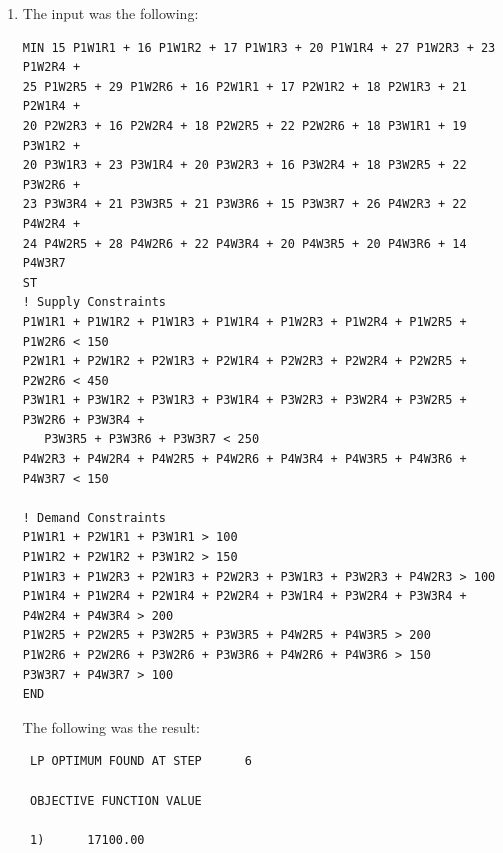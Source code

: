 \documentclass[11pt,letterpaper]{article}
\begin{document}
\begin{enumerate}
	\item The input was the following:
	\begin{verbatim}
MIN	15 P1W1R1 + 16 P1W1R2 + 17 P1W1R3 + 20 P1W1R4 + 27 P1W2R3 + 23 P1W2R4 + 
25 P1W2R5 + 29 P1W2R6 + 16 P2W1R1 + 17 P2W1R2 + 18 P2W1R3 + 21 P2W1R4 + 
20 P2W2R3 + 16 P2W2R4 + 18 P2W2R5 + 22 P2W2R6 + 18 P3W1R1 + 19 P3W1R2 + 
20 P3W1R3 + 23 P3W1R4 + 20 P3W2R3 + 16 P3W2R4 + 18 P3W2R5 + 22 P3W2R6 + 
23 P3W3R4 + 21 P3W3R5 + 21 P3W3R6 + 15 P3W3R7 + 26 P4W2R3 + 22 P4W2R4 + 
24 P4W2R5 + 28 P4W2R6 + 22 P4W3R4 + 20 P4W3R5 + 20 P4W3R6 + 14 P4W3R7
ST
! Supply Constraints
P1W1R1 + P1W1R2 + P1W1R3 + P1W1R4 + P1W2R3 + P1W2R4 + P1W2R5 + P1W2R6 < 150
P2W1R1 + P2W1R2 + P2W1R3 + P2W1R4 + P2W2R3 + P2W2R4 + P2W2R5 + P2W2R6 < 450
P3W1R1 + P3W1R2 + P3W1R3 + P3W1R4 + P3W2R3 + P3W2R4 + P3W2R5 + P3W2R6 + P3W3R4 +
   P3W3R5 + P3W3R6 + P3W3R7 < 250
P4W2R3 + P4W2R4 + P4W2R5 + P4W2R6 + P4W3R4 + P4W3R5 + P4W3R6 + P4W3R7 < 150

! Demand Constraints
P1W1R1 + P2W1R1 + P3W1R1 > 100
P1W1R2 + P2W1R2 + P3W1R2 > 150
P1W1R3 + P1W2R3 + P2W1R3 + P2W2R3 + P3W1R3 + P3W2R3 + P4W2R3 > 100
P1W1R4 + P1W2R4 + P2W1R4 + P2W2R4 + P3W1R4 + P3W2R4 + P3W3R4 + P4W2R4 + P4W3R4 > 200
P1W2R5 + P2W2R5 + P3W2R5 + P3W3R5 + P4W2R5 + P4W3R5 > 200
P1W2R6 + P2W2R6 + P3W2R6 + P3W3R6 + P4W2R6 + P4W3R6 > 150
P3W3R7 + P4W3R7 > 100
END
	\end{verbatim}
	
	The following was the result:
	\begin{verbatim}
 LP OPTIMUM FOUND AT STEP      6
 
 OBJECTIVE FUNCTION VALUE
 
 1)      17100.00
 

\end{verbatim}
\end{enumerate}
\end{document}
